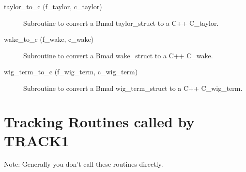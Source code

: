 \begin{description}
\item[taylor_to_c (f_taylor, c_taylor)] \Newline 
Subroutine to convert a Bmad taylor_struct to a C++ C_taylor.

\item[wake_to_c (f_wake, c_wake)] \Newline 
Subroutine to convert a Bmad wake_struct to a C++ C_wake.

\item[wig_term_to_c (f_wig_term, c_wig_term)] \Newline 
Subroutine to convert a Bmad wig_term_struct to a C++ C_wig_term.

\end{description}

\section{Tracking Routines called by TRACK1}
\label{r:track1}   

Note: Generally you don't call these routines directly.

